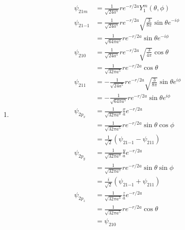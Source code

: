 \documentclass{article}
\begin{document}
\subsection{}

\begin{enumerate}
  \item

        \begin{align*}
          \psi_{2 1 m}    & = \frac{1}{\sqrt{24 a^5}} r e^{-r / 2 a} Y_1^m(\theta, \phi)                            \\
          \psi_{2 1 {-1}} & = \frac{1}{\sqrt{24 a^5}} r e^{-r / 2 a} \sqrt{\frac{3}{8 \pi}} \sin \theta e^{-i \phi} \\
                          & = \frac{1}{\sqrt{64 \pi a^5}} r e^{-r / 2 a} \sin \theta e^{-i \phi}                    \\
          \psi_{2 1 0}    & = \frac{1}{\sqrt{24 a^5}} r e^{-r / 2 a} \sqrt{\frac{3}{4 \pi}} \cos \theta             \\
                          & = \frac{1}{\sqrt{32 \pi a^5}} r e^{-r / 2 a} \cos \theta                                \\
          \psi_{2 1 1}    & = -\frac{1}{\sqrt{24 a^5}} r e^{-r / 2 a} \sqrt{\frac{3}{8 \pi}} \sin \theta e^{i \phi} \\
                          & = -\frac{1}{\sqrt{64 \pi a^5}} r e^{-r / 2 a} \sin \theta e^{i \phi}                    \\
          \psi_{2 p_x}    & = \frac{1}{\sqrt{32 \pi a^3}} \frac{x}{a} e^{-r / 2 a}                                  \\
                          & = \frac{1}{\sqrt{32 \pi a^5}} r e^{-r / 2 a} \sin \theta \cos \phi                      \\
                          & = \frac{1}{\sqrt{2}} (\psi_{2 1 {-1}} - \psi_{2 1 1})                                   \\
          \psi_{2 p_y}    & = \frac{1}{\sqrt{32 \pi a^3}} \frac{y}{a} e^{-r / 2 a}                                  \\
                          & = \frac{1}{\sqrt{32 \pi a^5}} r e^{-r / 2 a} \sin \theta \sin \phi                      \\
                          & = \frac{i}{\sqrt{2}} (\psi_{2 1 {-1}} + \psi_{2 1 1})                                   \\
          \psi_{2 p_z}    & = \frac{1}{\sqrt{32 \pi a^3}} \frac{z}{a} e^{-r / 2 a}                                  \\
                          & = \frac{1}{\sqrt{32 \pi a^5}} r e^{-r / 2 a} \cos \theta                                \\
                          & = \psi_{2 1 0}
        \end{align*}
\end{enumerate}
\end{document}

